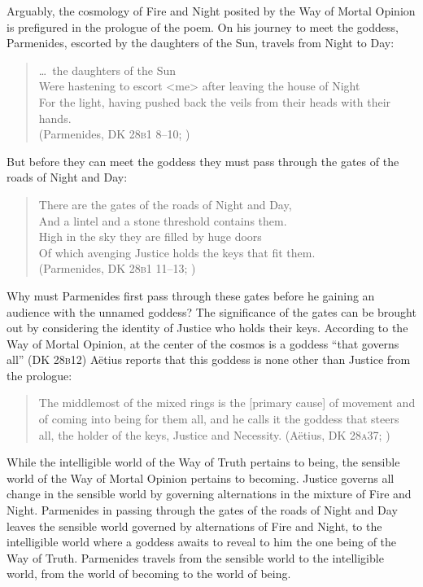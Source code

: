 Arguably, the cosmology of Fire and Night posited by the Way of Mortal Opinion is prefigured in the prologue of the poem. On his journey to meet the goddess, Parmenides, escorted by the daughters of the Sun, travels from Night to Day:
\begin{verse}
    \ldots\ the daughters of the Sun\\
    Were hastening to escort <me> after leaving the house of Night\\
    For the light, having pushed back the veils from their heads with their hands.\\ 
    (Parmenides, DK 28\textsc{b}1 8--10; \citealt[151]{McKirahan:1994ve})
\end{verse}
But before they can meet the goddess they must pass through the gates of the roads of Night and Day:
\begin{verse}
    There are the gates of the roads of Night and Day,\\
    And a lintel and a stone threshold contains them.\\ 
    High in the sky they are filled by huge doors\\
    Of which avenging Justice holds the keys that fit them.\\
    (Parmenides, DK 28\textsc{b}1 11--13; \citealt[151]{McKirahan:1994ve})
\end{verse}
Why must Parmenides first pass through these gates before he gaining an audience with the unnamed goddess? The significance of the gates can be brought out by considering the identity of Justice who holds their keys. According to the Way of Mortal Opinion, at the center of the cosmos is a goddess ``that governs all'' (DK 28\textsc{b}12)  Aëtius reports that this goddess is none other than Justice from the prologue:
\begin{quote}
	The middlemost of the mixed rings is the [primary cause] of movement and of coming into being for them all, and he calls it the goddess that steers all, the holder of the keys, Justice and Necessity. (Aëtius, DK 28\textsc{a}37; \citealt[151]{McKirahan:1994ve})
\end{quote}
While the intelligible world of the Way of Truth pertains to being, the sensible world of the Way of Mortal Opinion pertains to becoming. Justice governs all change in the sensible world by governing alternations in the mixture of Fire and Night. Parmenides in passing through the gates of the roads of Night and Day leaves the sensible world governed by alternations of Fire and Night, to the intelligible world where a goddess awaits to reveal to him the one being of the Way of Truth. Parmenides travels from the sensible world to the intelligible world, from the world of becoming to the world of being.

